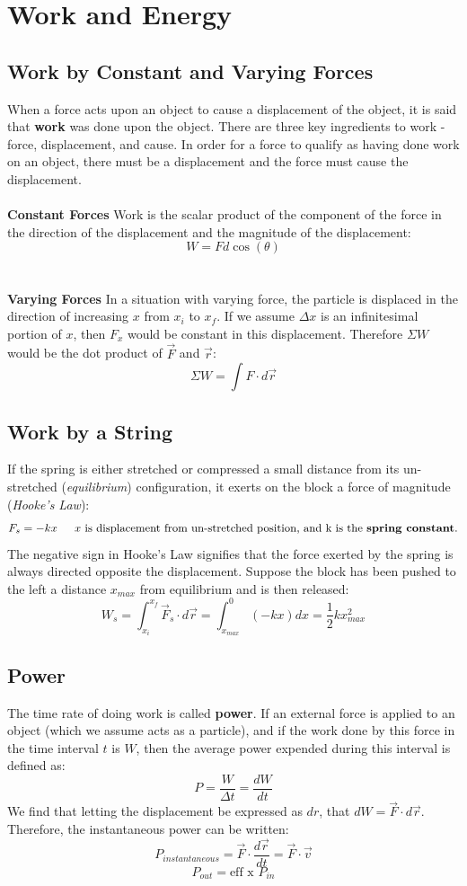 \documentclass{article}
\begin{document}
\section{Work and Energy}
\subsection{Work by Constant and Varying Forces}
When a force acts upon an object to cause a displacement of the object, it is said that \textbf{work} was done upon the object. There are three key ingredients to work - force, displacement, and cause. In order for a force to qualify as having done work on an object, there must be a displacement and the force must cause the displacement.
\\\\
\textbf{Constant Forces} Work is the scalar product of the component of the force in the direction of the displacement and the magnitude of the displacement:
\[
W=Fd\cos(\theta)
\]
\\\\
\textbf{Varying Forces} In a situation with varying force, the particle is displaced in the direction of increasing $x$ from $x_i$ to $x_f$. If we assume $\Delta x$ is an infinitesimal portion of $x$, then $F_x$ would be constant in this displacement. Therefore $\Sigma W$ would be the dot product of $\vec{F}$ and $\vec{r}$:
\[
\Sigma W=\int F\cdot d\vec{r}
\]
\subsection{Work by a String}
If the spring is either stretched or compressed a small distance from its un-stretched (\textit{equilibrium}) configuration, it exerts on the block a force of magnitude (\textit{Hooke's Law}):
\[
F_s=-kx \indent
\text{$x$ is displacement from un-stretched position, and k is the \textbf{spring constant}.}
\]
The negative sign in Hooke's Law signifies that the force exerted by the spring is always directed opposite the displacement. Suppose the block has been pushed to the left a distance $x_{max}$ from equilibrium and is then released:
\[
W_s=\int_{x_i}^{x_f} \vec{F}_s\cdot d\vec{r}=\int_{x_{max}}^0 (-kx)dx=\frac{1}{2} kx_{max}^2
\]

\subsection{Power}
The time rate of doing work is called \textbf{power}. If an external force is applied to an object (which we assume acts as a particle), and if the work done by this force in the time interval $t$ is $W$, then the average power expended during this interval is defined as:
\[
P=\frac{W}{\Delta t}=\frac{dW}{dt}
\]
We find that letting the displacement be expressed as $dr$, that $dW=\vec{F}\cdot d\vec{r}$. Therefore, the instantaneous power can be written:
\[
P_{instantaneous}=\vec{F}\cdot \frac{d\vec{r}}{dt}=\vec{F}\cdot \vec{v}
\]
\[
P_{out}=\text{eff x } P_{in}
\]
\end{document}

